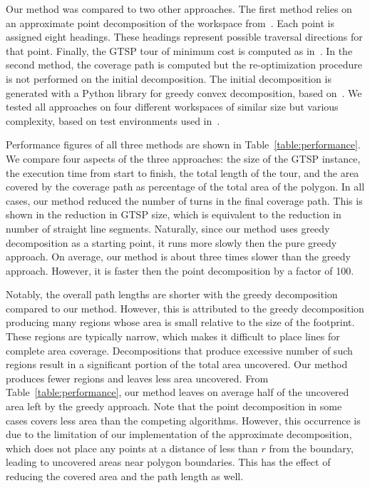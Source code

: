 \documentclass[../main.tex]{subfiles}
\begin{document}
Our method was compared to two other approaches. The first method relies on an approximate point decomposition of the workspace from~\cite{arkin2000approximation}. Each point is assigned eight headings. These headings represent possible traversal directions for that point. Finally, the GTSP tour of minimum cost is computed as in~\cite{le2012dubins}. In the second method, the coverage path is computed but the re-optimization procedure is not performed on the initial decomposition. The initial decomposition is generated with a Python library for greedy convex decomposition, based on~\cite{fernandez2008practical}. We tested all approaches on four different workspaces of similar size but various complexity, based on test environments used in~\cite{choi2009online}.

Performance figures of all three methods are shown in Table~\ref{table:performance}. We compare four aspects of the three approaches: the size of the GTSP instance, the execution time from start to finish, the total length of the tour, and the area covered by the coverage path as percentage of the total area of the polygon. In all cases, our method reduced the number of turns in the final coverage path. This is shown in the reduction in GTSP size, which is equivalent to the reduction in number of straight line segments. Naturally, since our method uses greedy decomposition as a starting point, it runs more slowly then the pure greedy approach. On average, our method is about three times slower than the greedy approach. However, it is faster then the point decomposition by a factor of 100. 

Notably, the overall path lengths are shorter with the greedy decomposition compared to our method. However, this is attributed to the greedy decomposition producing many regions whose area is small relative to the size of the footprint. These regions are typically narrow, which makes it difficult to place lines for complete area coverage. Decompositions that produce excessive number of such regions result in a significant portion of the total area uncovered. Our method produces fewer regions and leaves less area uncovered. From Table~\ref{table:performance}, our method leaves on average half of the uncovered area left by the greedy approach. Note that the point decomposition in some cases covers less area than the competing algorithms. However, this occurrence is due to the limitation of our implementation of the approximate decomposition, which does not place any points at a distance of less than $r$ from the boundary, leading to uncovered areas near polygon boundaries. This has the effect of reducing the covered area and the path length as well.
\end{document}
